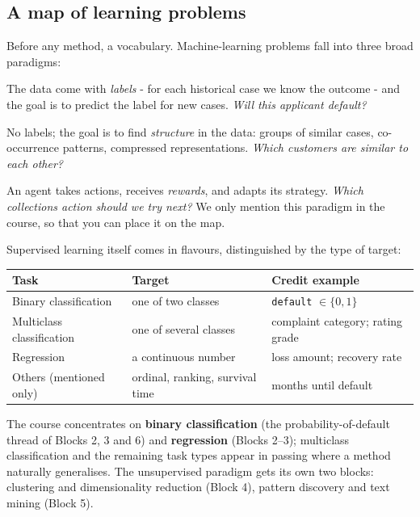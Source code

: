 \documentclass[11pt,a4paper]{article}
\begin{document}
\subsection{A map of learning problems}
Before any method, a vocabulary. Machine-learning problems fall into three
broad paradigms:
\begin{description}[leftmargin=1.4em,style=nextline,itemsep=2pt]
  \item[Supervised learning.] The data come with \emph{labels} - for each
        historical case we know the outcome - and the goal is to predict the
        label for new cases. \emph{Will this applicant default?}
  \item[Unsupervised learning.] No labels; the goal is to find
        \emph{structure} in the data: groups of similar cases, co-occurrence
        patterns, compressed representations. \emph{Which customers are
        similar to each other?}
  \item[Reinforcement learning.] An agent takes actions, receives
        \emph{rewards}, and adapts its strategy. \emph{Which collections
        action should we try next?} We only mention this paradigm in the
        course, so that you can place it on the map.
\end{description}

Supervised learning itself comes in flavours, distinguished by the type of
target:
\begin{center}\small
\begin{tabular}{@{}lp{4.6cm}p{5.2cm}@{}}
\toprule
Task & Target & Credit example \\
\midrule
Binary classification & one of two classes & \texttt{default} $\in \{0,1\}$ \\
Multiclass classification & one of several classes & complaint category; rating grade \\
Regression & a continuous number & loss amount; recovery rate \\
Others (mentioned only) & ordinal, ranking, survival time & months until default \\
\bottomrule
\end{tabular}
\end{center}

The course concentrates on \textbf{binary classification} (the
probability-of-default thread of Blocks 2, 3 and 6) and \textbf{regression}
(Blocks 2--3); multiclass classification and the remaining task types appear in
passing where a method naturally generalises. The unsupervised paradigm gets
its own two blocks: clustering and dimensionality reduction (Block 4),
pattern discovery and text mining (Block 5).
\end{document}
